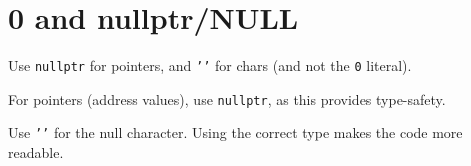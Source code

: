 
\section{0 and nullptr/NULL}\label{sec:0-and-nullptr/null}
Use \texttt{nullptr} for pointers, and \texttt{'\0'} for chars (and not the \texttt{0} literal).

For pointers (address values), use \texttt{nullptr}, as this provides type-safety.

Use \texttt{'\0'} for the null character. Using the correct type makes the code more readable.
